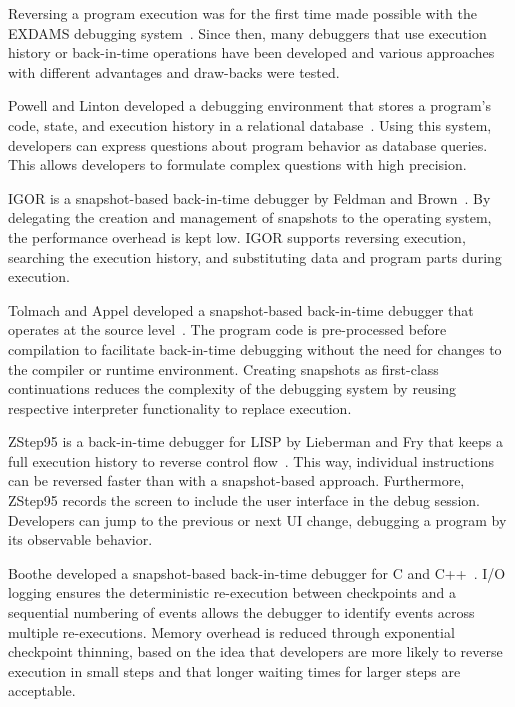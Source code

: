 Reversing a program execution was for the first time made possible with the EXDAMS debugging system~\cite{balzer69:exdams_extendable_debugging}.
Since then, many debuggers that use execution history or back-in-time operations have been developed and various approaches with different advantages and draw-backs were tested.

Powell and Linton developed a debugging environment that stores a program's code, state, and execution history in a relational database~\cite{powell83:a_database_model}.
Using this system, developers can express questions about program behavior as database queries.
This allows developers to formulate complex questions with high precision.

IGOR is a snapshot-based back-in-time debugger by Feldman and Brown~\cite{feldman88:igor_a_system}.
By delegating the creation and management of snapshots to the operating system, the performance overhead is kept low.
IGOR supports reversing execution, searching the execution history, and substituting data and program parts during execution.

Tolmach and Appel developed a snapshot-based back-in-time debugger that operates at the source level~\cite{tolmach93:a_debugger_for_standard}.
The program code is pre-processed before compilation to facilitate back-in-time debugging without the need for changes to the compiler or runtime environment.
Creating snapshots as first-class continuations reduces the complexity of the debugging system by reusing respective interpreter functionality to replace execution.

ZStep95 is a back-in-time debugger for LISP by Lieberman and Fry that keeps a full execution history to reverse control flow~\cite{lieberman95:zstep_95_a_reversible}.
This way, individual instructions can be reversed faster than with a snapshot-based approach.
Furthermore, ZStep95 records the screen to include the user interface in the debug session.
Developers can jump to the previous or next UI change, debugging a program by its observable behavior.

Boothe developed a snapshot-based back-in-time debugger for C and C++~\cite{boothe00:efficient_algorithms_for_bidirectional}.
I/O logging ensures the deterministic re-execution between checkpoints and a sequential numbering of events allows the debugger to identify events across multiple re-executions.
Memory overhead is reduced through exponential checkpoint thinning, based on the idea that developers are more likely to reverse execution in small steps and that longer waiting times for larger steps are acceptable.


